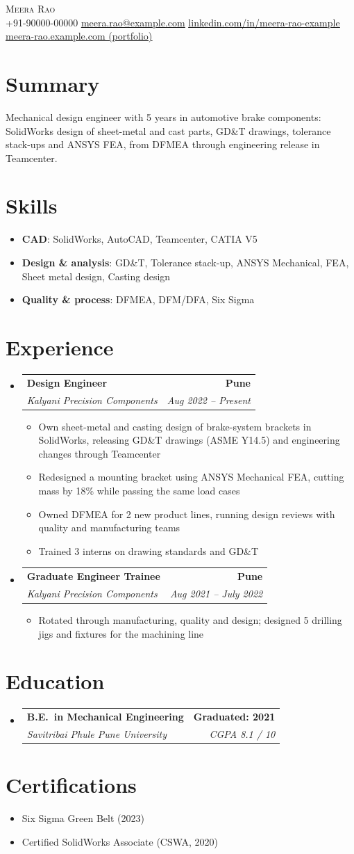 \documentclass[letterpaper,11pt]{article}
\makeatletter
\newcommand{\resumeItem}[1]{\small\item{{#1 \vspace{-2pt}}}}
\newcommand{\resumeSubheading}[4]{
  \item
    \begin{tabular*}{1.0\textwidth}[t]{l@{\extracolsep{\fill}}r}
      \textbf{#1} & \textbf{\small #2} \\
      \textit{\small#3} & \textit{\small #4} \\
    \end{tabular*}\vspace{-6pt}
}
\newcommand{\resumeItemListStart}{\begin{itemize}}
\newcommand{\resumeItemListEnd}{\end{itemize}\vspace{-5pt}}
\newcommand{\resumeSubHeadingListStart}{\begin{itemize}[leftmargin=0.0in, label={}]}
\newcommand{\resumeSubHeadingListEnd}{\end{itemize}}
\newcommand{\resumeSkillItem}[2]{
  \resumeItem{
    \textbf{#1}{:\hspace{0.5mm}#2 \vspace{-0.5mm}}
  }
}
\newcommand{\resumeSubItem}[2]{\resumeSkillItem{#1}{#2}\vspace{-4pt}}
\makeatother
\begin{document}
\begin{center}
    {\Huge \scshape Meera Rao} \\ \vspace{6pt}
    \small +91-90000-00000 \textbar{}
    \href{mailto:meera.rao@example.com}{\underline{meera.rao@example.com}} \textbar{}
    \href{https://www.linkedin.com/in/meera-rao-example/}{\underline{linkedin.com/in/meera-rao-example}} \textbar{}
    \href{https://meera-rao.example.com}{\underline{meera-rao.example.com (portfolio)}}
\end{center}
\section{Summary}
Mechanical design engineer with 5 years in automotive brake components: SolidWorks design of sheet-metal and cast parts, GD\&T drawings, tolerance stack-ups and ANSYS FEA, from DFMEA through engineering release in Teamcenter.
\section{Skills}
\resumeItemListStart[label=\textbullet]
  \resumeSubItem{CAD}{ SolidWorks, AutoCAD, Teamcenter, CATIA V5 }
  \resumeSubItem{Design \& analysis}{ GD\&T, Tolerance stack-up, ANSYS Mechanical, FEA, Sheet metal design, Casting design }
  \resumeSubItem{Quality \& process}{ DFMEA, DFM/DFA, Six Sigma }
\resumeItemListEnd
\section{Experience}
\resumeSubHeadingListStart
  \resumeSubheading{Design Engineer}{Pune}{Kalyani Precision Components}{Aug 2022 -- Present}
    \resumeItemListStart[label=\textbullet]
      \resumeItem{Own sheet-metal and casting design of brake-system brackets in SolidWorks, releasing GD\&T drawings (ASME Y14.5) and engineering changes through Teamcenter}
      \resumeItem{Redesigned a mounting bracket using ANSYS Mechanical FEA, cutting mass by 18\% while passing the same load cases}
      \resumeItem{Owned DFMEA for 2 new product lines, running design reviews with quality and manufacturing teams}
      \resumeItem{Trained 3 interns on drawing standards and GD\&T}
    \resumeItemListEnd
  \resumeSubheading{Graduate Engineer Trainee}{Pune}{Kalyani Precision Components}{Aug 2021 -- July 2022}
    \resumeItemListStart[label=\textbullet]
      \resumeItem{Rotated through manufacturing, quality and design; designed 5 drilling jigs and fixtures for the machining line}
    \resumeItemListEnd
\resumeSubHeadingListEnd
\section{Education}
\resumeSubHeadingListStart
  \resumeSubheading{B.E.\ in Mechanical Engineering}{Graduated: 2021}{Savitribai Phule Pune University}{CGPA 8.1 / 10}
\resumeSubHeadingListEnd
\section{Certifications}
\resumeItemListStart[label=\textbullet]
  \resumeItem{Six Sigma Green Belt (2023)}
  \resumeItem{Certified SolidWorks Associate (CSWA, 2020)}
\resumeItemListEnd
\end{document}
